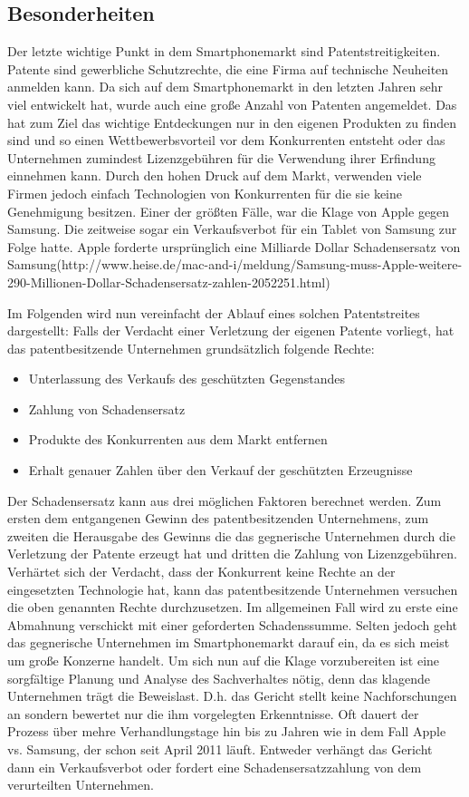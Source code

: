 \subsection{Besonderheiten}
Der letzte wichtige Punkt in dem Smartphonemarkt sind Patentstreitigkeiten. Patente sind gewerbliche Schutzrechte, die eine Firma auf technische Neuheiten anmelden kann. Da sich auf dem Smartphonemarkt in den letzten Jahren sehr viel entwickelt hat, wurde auch eine große Anzahl von Patenten angemeldet. Das hat zum Ziel das wichtige Entdeckungen nur in den eigenen Produkten zu finden sind und so einen Wettbewerbsvorteil vor dem Konkurrenten entsteht oder das Unternehmen zumindest Lizenzgebühren für die Verwendung ihrer Erfindung einnehmen kann.  Durch den hohen Druck auf dem Markt, verwenden viele Firmen jedoch einfach Technologien von Konkurrenten für die sie keine Genehmigung besitzen. Einer der größten Fälle, war die Klage von Apple gegen Samsung. Die zeitweise sogar ein Verkaufsverbot für ein Tablet von Samsung zur Folge hatte. Apple forderte ursprünglich eine Milliarde Dollar Schadensersatz von Samsung(http://www.heise.de/mac-and-i/meldung/Samsung-muss-Apple-weitere-290-Millionen-Dollar-Schadensersatz-zahlen-2052251.html)

Im Folgenden wird nun vereinfacht der Ablauf eines solchen Patentstreites dargestellt: Falls der Verdacht einer Verletzung der eigenen Patente vorliegt,  hat das patentbesitzende  Unternehmen grundsätzlich folgende Rechte:
\begin{itemize}
\item  Unterlassung des Verkaufs des geschützten Gegenstandes
\item  Zahlung von Schadensersatz
\item  Produkte des Konkurrenten aus dem Markt entfernen
\item  Erhalt genauer Zahlen über den Verkauf der geschützten Erzeugnisse
\end{itemize}

Der Schadensersatz kann aus drei möglichen Faktoren berechnet werden. Zum ersten dem entgangenen Gewinn des patentbesitzenden Unternehmens, zum zweiten die Herausgabe des Gewinns die das gegnerische Unternehmen durch die Verletzung der Patente erzeugt hat und dritten die Zahlung von Lizenzgebühren. Verhärtet sich der Verdacht, dass der Konkurrent keine Rechte an der eingesetzten Technologie hat, kann das patentbesitzende Unternehmen versuchen die oben genannten Rechte durchzusetzen. Im allgemeinen Fall wird zu erste eine Abmahnung verschickt mit einer geforderten  Schadenssumme. Selten jedoch geht das gegnerische Unternehmen im Smartphonemarkt darauf ein, da es sich meist um große Konzerne handelt. Um sich nun auf die Klage vorzubereiten ist eine sorgfältige Planung und Analyse des Sachverhaltes nötig, denn das klagende Unternehmen trägt die Beweislast. D.h. das Gericht stellt keine Nachforschungen an sondern bewertet nur die ihm vorgelegten Erkenntnisse. Oft dauert der Prozess über mehre Verhandlungstage hin bis zu Jahren wie in dem Fall  Apple vs. Samsung,  der schon seit April 2011 läuft. Entweder verhängt das Gericht dann ein Verkaufsverbot oder fordert eine Schadensersatzzahlung von dem verurteilten Unternehmen.

